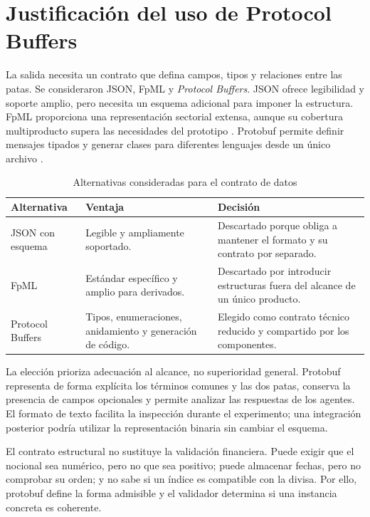 \section{Justificación del uso de Protocol Buffers}
\label{sec:justificacion_protobuf}

La salida necesita un contrato que defina campos, tipos y relaciones entre las patas. Se consideraron JSON, FpML y \textit{Protocol Buffers}. JSON ofrece legibilidad y soporte amplio, pero necesita un esquema adicional para imponer la estructura. FpML proporciona una representación sectorial extensa, aunque su cobertura multiproducto supera las necesidades del prototipo \citep{fpml-home}. Protobuf permite definir mensajes tipados y generar clases para diferentes lenguajes desde un único archivo \citep{protobuf-overview}.

\begin{table}[H]
\centering
\small
\caption{Alternativas consideradas para el contrato de datos}
\label{tab:alternativas_contrato_datos}
\begin{tabular}{|P{2.7cm}|P{4.5cm}|P{5.6cm}|}
\hline
\textbf{Alternativa} & \textbf{Ventaja} & \textbf{Decisión} \\
\hline
JSON con esquema & Legible y ampliamente soportado. & Descartado porque obliga a mantener el formato y su contrato por separado. \\
\hline
FpML & Estándar específico y amplio para derivados. & Descartado por introducir estructuras fuera del alcance de un único producto. \\
\hline
Protocol Buffers & Tipos, enumeraciones, anidamiento y generación de código. & Elegido como contrato técnico reducido y compartido por los componentes. \\
\hline
\end{tabular}
\end{table}

La elección prioriza adecuación al alcance, no superioridad general. Protobuf representa de forma explícita los términos comunes y las dos patas, conserva la presencia de campos opcionales y permite analizar las respuestas de los agentes. El formato de texto facilita la inspección durante el experimento; una integración posterior podría utilizar la representación binaria sin cambiar el esquema.

El contrato estructural no sustituye la validación financiera. Puede exigir que el nocional sea numérico, pero no que sea positivo; puede almacenar fechas, pero no comprobar su orden; y no sabe si un índice es compatible con la divisa. Por ello, protobuf define la forma admisible y el validador determina si una instancia concreta es coherente.

